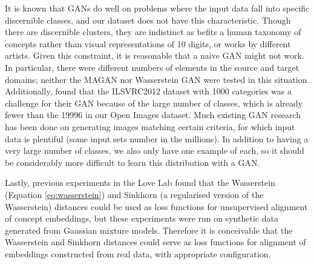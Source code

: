 It is known that GANs do well on problems where the input data fall into specific discernible classes, and our dataset does not have this characteristic. Though there are discernible clusters, they are indistinct as befits a human taxonomy of concepts rather than visual representations of 10 digits, or works by different artists. Given this constraint, it is reasonable that a naive GAN might not work. In particular, there were different numbers of elements in the source and target domains; neither the MAGAN nor Wasserstein GAN were tested in this situation. Additionally, \cite{ImprovedTechniquesTrainingGANS} found that the ILSVRC2012 dataset with 1000 categories was a challenge for their GAN because of the large number of classes, which is already fewer than the 19996 in our Open Images dataset. Much existing GAN research has been done on generating images matching certain criteria, for which input data is plentiful (some input sets number in the millions). In addition to having a very large number of classes, we also only have one example of each, so it should be considerably more difficult to learn this distribution with a GAN. 

Lastly, previous experiments in the Love Lab \cite{AraoThesis} found that the Wasserstein (Equation \ref{eq:wasserstein}) and Sinkhorn (a regularised version of the Wasserstein) distances could be used as loss functions for unsupervised alignment of concept embeddings, but these experiments were run on synthetic data generated from Gaussian mixture models. Therefore it is conceivable that the Wasserstein and Sinkhorn distances could serve as loss functions for alignment of embeddings constructed from real data, with appropriate configuration. 